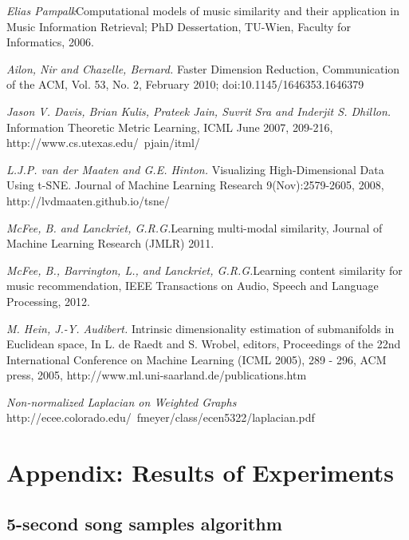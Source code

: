 \documentclass[10pt]{article}
\begin{document}
\begin{thebibliography}{5}
\textit{Elias Pampalk}Computational models of music similarity and their application in Music Information Retrieval; PhD Dessertation, TU-Wien, Faculty for Informatics, 2006.

\textit{Ailon, Nir and Chazelle, Bernard.} Faster Dimension Reduction, Communication of the ACM, Vol. 53, No. 2, February 2010;  doi:10.1145/1646353.1646379

\textit{Jason V. Davis, Brian Kulis, Prateek Jain, Suvrit Sra and Inderjit S. Dhillon.} Information Theoretic Metric Learning, ICML June 2007, 209-216,  http://www.cs.utexas.edu/~pjain/itml/

\textit{L.J.P. van der Maaten and G.E. Hinton.} Visualizing High-Dimensional Data Using t-SNE. Journal of Machine Learning Research 9(Nov):2579-2605, 2008, http://lvdmaaten.github.io/tsne/

\textit{McFee, B. and Lanckriet, G.R.G.}Learning multi-modal similarity, Journal of Machine Learning Research (JMLR) 2011.

 \textit{McFee, B., Barrington, L., and Lanckriet, G.R.G.}Learning content similarity for music recommendation, IEEE Transactions on Audio, Speech and Language Processing, 2012.

\textit{M. Hein, J.-Y. Audibert. }Intrinsic dimensionality estimation of submanifolds in Euclidean space,
In L. de Raedt and S. Wrobel, editors, Proceedings of the 22nd International Conference on Machine Learning (ICML 2005), 289 - 296, ACM press, 2005, http://www.ml.uni-saarland.de/publications.htm

\textit{Non-normalized Laplacian on Weighted Graphs} http://ecee.colorado.edu/~fmeyer/class/ecen5322/laplacian.pdf

\end{thebibliography}

\section{Appendix: Results of Experiments}
\subsection{5-second song samples algorithm}
\end{document}
